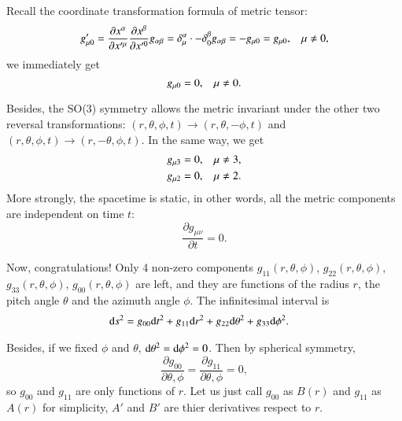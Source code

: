 \documentclass[openany,10pt]{book}
\theoremstyle{definition}
\theoremstyle{definition}
\theoremstyle{remark}
\begin{document}
Recall the coordinate transformation formula of metric tensor:
\begin{equation}
    g'_{\mu0}=\frac{\partial x^\alpha}{\partial x'^\mu}\frac{\partial x^\beta}{\partial x'^0}g_{\alpha\beta}=\delta^\alpha_\mu\cdot - \delta^\beta_0 g_{\alpha\beta}=-g_{\mu0}=g_{\mu0}, \hspace{3mm} \mu\neq0,
\end{equation}
we immediately get
\begin{equation}
    g_{\mu0}=0,\hspace{3mm} \mu\neq0.
\end{equation}

Besides, the SO(3) symmetry allows the metric invariant under the other two reversal transformations: $(r,\theta,\phi,t) \longrightarrow (r,\theta,-\phi,t)$ and $(r,\theta,\phi,t) \longrightarrow (r,-\theta,\phi,t)$. In the same way, we get
\begin{equation}
\begin{aligned}
      &g_{\mu3}=0,\hspace{3mm} \mu\neq3,\\
      &g_{\mu2}=0,\hspace{3mm} \mu\neq2.
\end{aligned}
\end{equation}
More strongly, the spacetime is static, in other words, all the metric components are independent on time $t$:
\begin{equation}
    \frac{\partial g_{\mu\nu}}{\partial t}=0.
\end{equation}

Now, congratulations! Only 4 non-zero components $g_{11}(r,\theta,\phi)$, $g_{22}(r,\theta,\phi)$, 
$g_{33}(r,\theta,\phi)$, $g_{00}(r,\theta,\phi)$ are left, and they are functions of the radius $r$, the pitch angle $\theta$ and the azimuth angle $\phi$. The infinitesimal interval is 
\begin{equation}
\begin{aligned}
    {\rm{d}}s^2&=g_{00}{\rm{d}}t^2+g_{11}{\rm{d}}r^2+g_{22}{\rm{d}}\theta^2+g_{33}{\rm{d}}\phi^2.
\end{aligned}
\end{equation} 

Besides, if we fixed $\phi$ and $\theta$, ${\rm{d}}\theta^2={\rm{d}}\phi^2=0$. Then by spherical symmetry,
\begin{equation}
    \frac{\partial g_{00}}{\partial \theta, \phi}=\frac{\partial g_{11}}{\partial \theta, \phi}=0,
\end{equation}
so $g_{00}$ and $g_{11}$ are only functions of $r$. Let us just call $g_{00}$ as $B(r)$ and $g_{11}$ as $A(r)$ for simplicity, $A'$ and $B'$ are thier derivatives respect to $r$.
\end{document}
